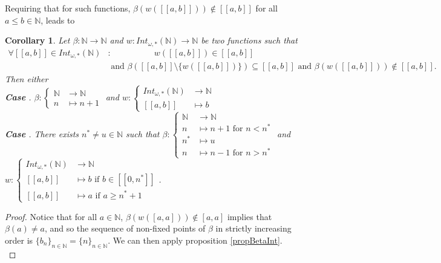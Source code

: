 \documentclass[a4paper,11pt]{article}
\newcommand*\circled[1]{\tikz[baseline=(char.base)]{
            \node[shape=circle,draw,inner sep=2pt] (char) {#1};}}
\theoremstyle{plain}
\newtheorem{corollary}{Corollary}[section]
\theoremstyle{definition}
\theoremstyle{remark}
\begin{document}
Requiring that for such functions, $\beta(w([\![a,b]\!])) \notin [\![a,b]\!]$ for all $a \leq b \in \mathbb{N}$, leads to

\begin{corollary}
Let $\beta : \mathbb{N} \to \mathbb{N}$ and $w : Int_{\omega,*}(\mathbb{N}) \to \mathbb{N}$ be two functions such that 
\begin{align*}
\forall [\![a,b]\!] \in Int_{\omega,*}(\mathbb{N}) &: \quad \quad \quad \quad \quad w([\![a,b]\!]) \in [\![a,b]\!] \\
 &\text{ and } \beta([\![a,b]\!]\setminus \{w([\![a,b]\!])\}) \subseteq [\![a,b]\!] \text{ and } \beta(w([\![a,b]\!])) \notin [\![a,b]\!].
\end{align*}
Then either \\
\textbf{Case \circled{1}}. $\beta : \begin{cases} \mathbb{N} &\to \mathbb{N} \\ n &\mapsto n+1 \end{cases}$ and $w : \begin{cases} Int_{\omega,*}(\mathbb{N}) &\to \mathbb{N} \\ [\![a,b]\!] &\mapsto b \end{cases}$ \\
\textbf{Case \circled{2}}. There exists $n^* \neq u \in \mathbb{N}$ such that $\beta : \begin{cases} \mathbb{N} &\to \mathbb{N} \\ n &\mapsto n+1 \text { for } n < n^* \\ n^* &\mapsto u \\ n &\mapsto n-1 \text{ for } n > n^* \end{cases}$ and $w : \begin{cases} Int_{\omega,*}(\mathbb{N}) &\to \mathbb{N} \\ [\![a,b]\!] &\mapsto b \text{ if } b \in [\![0,n^*]\!] \\  [\![a,b]\!] &\mapsto a \text{ if } a \geq n^*+  1 \end{cases}$.
\end{corollary}

\begin{proof}
Notice that for all $a \in \mathbb{N}$, $\beta(w([a,a])) \notin [a,a]$ implies that $\beta(a)\neq a$, and so the sequence of non-fixed points of $\beta$ in strictly increasing order is $\{b_n\}_{n \in \mathbb{N}} = \{n\}_{n \in \mathbb{N}}$. We can then apply proposition \ref{propBetaInt}. \\
\end{proof}
\end{document}
